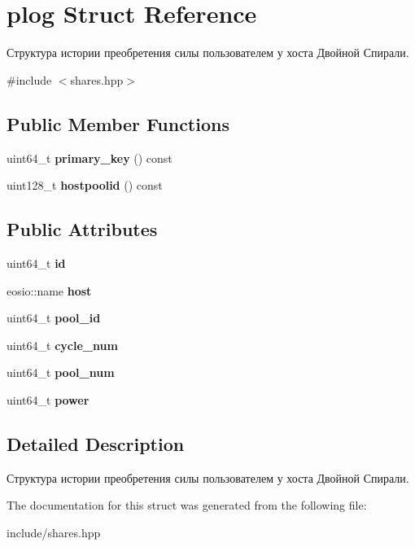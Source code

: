 \hypertarget{structplog}{}\section{plog Struct Reference}
\label{structplog}


Структура истории преобретения силы пользователем у хоста Двойной Спирали.  




{\ttfamily \#include $<$shares.\+hpp$>$}

\subsection*{Public Member Functions}
\begin{DoxyCompactItemize}
\item 
\mbox{\label{structplog_a8902d07feb1ca31a509e89362e5834e3}} 
uint64\+\_\+t {\bfseries primary\+\_\+key} () const
\item 
\mbox{\label{structplog_a6e5d2385d3e1fb9c8f9d220e2d17be61}} 
uint128\+\_\+t {\bfseries hostpoolid} () const
\end{DoxyCompactItemize}
\subsection*{Public Attributes}
\begin{DoxyCompactItemize}
\item 
\mbox{\label{structplog_a501a38bc5d48aa3a5d879cdcc104e40d}} 
uint64\+\_\+t {\bfseries id}
\item 
\mbox{\label{structplog_a9879ade8388b63b3b09e97f7adfd5df2}} 
eosio\+::name {\bfseries host}
\item 
\mbox{\label{structplog_ac7f6ba0c58f77cfdbc117db6dc7ed2cc}} 
uint64\+\_\+t {\bfseries pool\+\_\+id}
\item 
\mbox{\label{structplog_aa71a29d3e3781cd6a75b08c259cb347a}} 
uint64\+\_\+t {\bfseries cycle\+\_\+num}
\item 
\mbox{\label{structplog_a542d69ec24dac22598bd2638bf13b4ca}} 
uint64\+\_\+t {\bfseries pool\+\_\+num}
\item 
\mbox{\label{structplog_a024b8605bc0c7808115d7d2510b74705}} 
uint64\+\_\+t {\bfseries power}
\end{DoxyCompactItemize}


\subsection{Detailed Description}
Структура истории преобретения силы пользователем у хоста Двойной Спирали. 

The documentation for this struct was generated from the following file\+:\begin{DoxyCompactItemize}
\item 
include/shares.\+hpp\end{DoxyCompactItemize}
